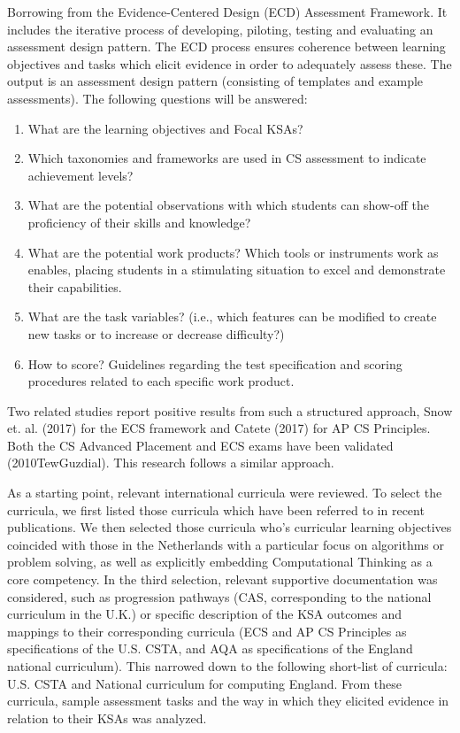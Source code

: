 Borrowing from the Evidence-Centered Design (ECD) Assessment Framework. It includes the iterative process of developing, piloting, testing and evaluating an assessment design pattern. The ECD process ensures coherence between learning objectives and tasks which elicit evidence in order to adequately assess these. The output is an assessment design pattern (consisting of templates and example assessments). The following questions will be answered:

\begin{enumerate}
\item What are the learning objectives and Focal KSAs?
\item Which taxonomies and frameworks are used in CS assessment to indicate achievement levels?
\item What are the potential observations with which students can show-off the proficiency of their skills and knowledge?
\item What are the potential work products? Which tools or instruments work as enables, placing students in a stimulating situation to excel and demonstrate their capabilities.
\item What are the task variables? (i.e., which features can be modified to create new tasks or to increase or decrease difficulty?)
\item How to score? Guidelines regarding the test specification and scoring procedures related to each specific work product.
\end{enumerate}

Two related studies report positive results from such a structured approach, Snow et. al. (2017) for the ECS framework and Catete (2017) for AP CS Principles. Both the CS Advanced Placement and ECS exams have been validated (2010TewGuzdial). This research follows a similar approach.


As a starting point, relevant international curricula were reviewed. To select the curricula, we first listed those curricula which have been referred to in recent publications. We then selected those curricula who’s curricular learning objectives coincided with those in the Netherlands with a particular focus on algorithms or problem solving, as well as explicitly embedding Computational Thinking as a core competency. In the third selection, relevant supportive documentation was considered, such as progression pathways (CAS, corresponding to the national curriculum in the U.K.) or specific description of the KSA outcomes and mappings to their corresponding curricula (ECS and AP CS Principles as specifications of the U.S. CSTA, and AQA as specifications of the England national curriculum). This narrowed down to the following short-list of curricula: U.S. CSTA and National curriculum for computing England. From these curricula, sample assessment tasks and the way in which they elicited evidence in relation to their KSAs was analyzed.

